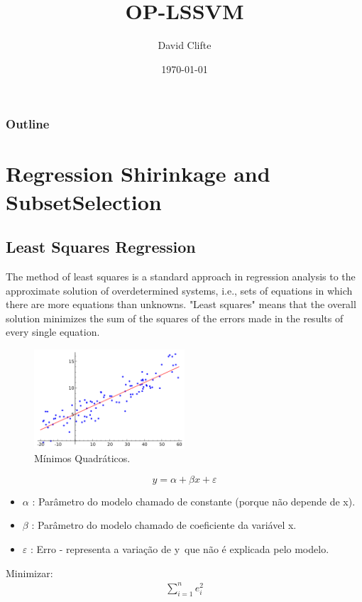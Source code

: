 \documentclass{beamer}
\title{OP-LSSVM}
\author{David Clifte\inst{1}}
\institute[Universities of]
{

\inst{1}%
Department of Computer Science\\
Univ of S
}
\date{\today} %
\begin{document}
	\begin{frame}
	\titlepage
	\end{frame}

\begin{frame}
	\frametitle{Outline}
	\tableofcontents
\end{frame}


\section{Regression Shirinkage and SubsetSelection}

\subsection{Least Squares Regression}
\begin{frame}
	The method of least squares is a standard approach in regression analysis to the
	approximate solution of overdetermined systems, i.e., sets of equations in which
	there are more equations than unknowns. "Least squares" means that the overall
	solution minimizes the sum of the squares of the errors made in the results of
	every single equation.

\begin{figure}[h!] \caption{Mínimos Quadráticos.} \centering
	\includegraphics[width=0.5\textwidth]{imagens/lsr.png} 
\end{figure}
\end{frame}
 



\begin{frame}
	\begin{equation}
		y = \alpha + \beta x + \varepsilon
	\end{equation}
	
	\begin{itemize}{}
	\item  $\alpha$ : Parâmetro do modelo chamado de constante (porque não depende
	de x).
	\item $\beta$ : Parâmetro do modelo chamado de coeficiente da variável x.
	\item   $\varepsilon$ : Erro - representa a variação de y\,\! que não é
	explicada pelo modelo.
	\end{itemize}
	
	Minimizar:
	\begin{align}
	\sum_{i=1}^n e_i^2
	\end{align}

\end{frame}
\end{document}
